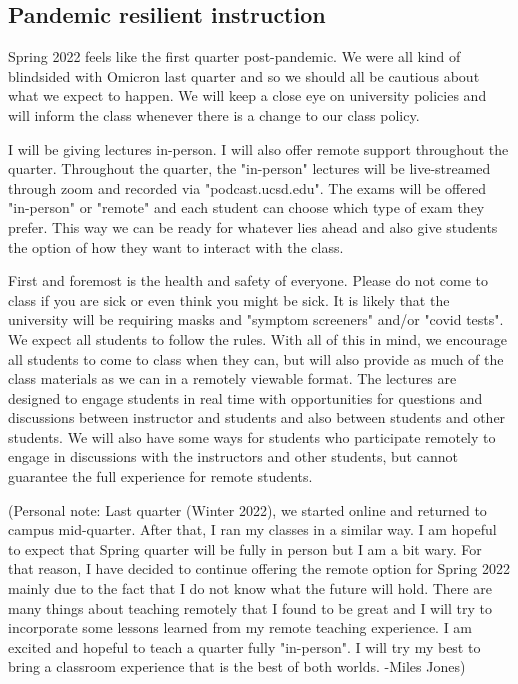 \documentclass[12pt, oneside]{article}
\begin{document}
\subsection*{Pandemic resilient instruction}
{\small
Spring 2022 feels like the first quarter post-pandemic. We were all kind of blindsided with Omicron last quarter and so we should all be cautious about what we expect to happen. We will keep a close eye on university policies and will inform the class whenever there is a change to our class policy.

I will be giving lectures in-person. I will also offer remote support throughout the quarter. Throughout the quarter, the "in-person" lectures will be live-streamed through zoom and recorded via "podcast.ucsd.edu". The exams will be offered "in-person" or "remote" and each student can choose which type of exam they prefer. This way we can be ready for whatever lies ahead and also give students the option of how they want to interact with the class.

First and foremost is the health and safety of everyone.  Please do not come to class if you are sick or even think you might be sick.  It is likely that the university will be requiring masks and "symptom screeners" and/or "covid tests". We expect all students to follow the rules. With all of this in mind, we encourage all students to come to class when they can, but will also provide as much of the class materials as we can in a remotely viewable format. The lectures are designed to engage students in real time with opportunities for questions and discussions between instructor and students and also between students and other students.   We will also have some ways for students who participate remotely to engage in discussions with the instructors and other students, but cannot guarantee the full experience for remote students. 

(Personal note: Last quarter (Winter 2022), we started online and returned to campus mid-quarter. After that, I ran my classes in a similar way. I am hopeful to expect that Spring quarter will be fully in person but I am a bit wary. For that reason, I have decided to continue offering the remote option for Spring 2022 mainly due to the fact that I do not know what the future will hold. There are many things about teaching remotely that I found to be great and I will try to incorporate some lessons learned from my remote teaching experience. I am excited and hopeful to teach a quarter fully "in-person". I will try my best to bring a classroom experience that is the best of both worlds.
-Miles Jones) }
\end{document}
